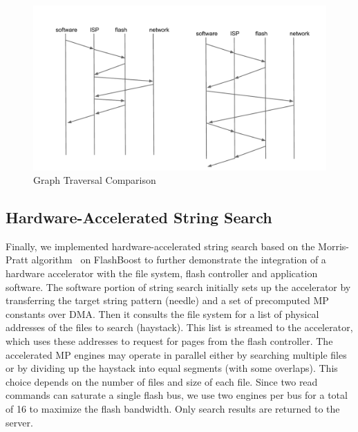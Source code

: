 \begin{figure}[h]
	\begin{center}
	\includegraphics[width=0.4\paperwidth]{figures/graph_accel.pdf}
	\caption{Graph Traversal Comparison}
	\label{fig:graph_accel}
	\end{center}
\end{figure}

\subsection{Hardware-Accelerated String Search}

Finally, we implemented hardware-accelerated string search based on the
Morris-Pratt algorithm~\cite{?} on FlashBoost to further demonstrate the
integration of a hardware accelerator with the file system, flash controller
and application software.  The software portion of string search initially sets
up the accelerator by transferring the target string pattern (needle) and a set
of precomputed MP constants over DMA. Then it consults the file system for a
list of physical addresses of the files to search (haystack).  This list is
streamed to the accelerator, which uses these addresses to request for pages
from the flash controller.  The accelerated MP engines may operate in parallel
either by searching multiple files or by dividing up the haystack into equal
segments (with some overlaps). This choice depends on the number of files and
size of each file. Since two read commands can saturate a single flash bus, we
use two engines per bus for a total of 16 to maximize the flash bandwidth. Only
search results are returned to the server. 
